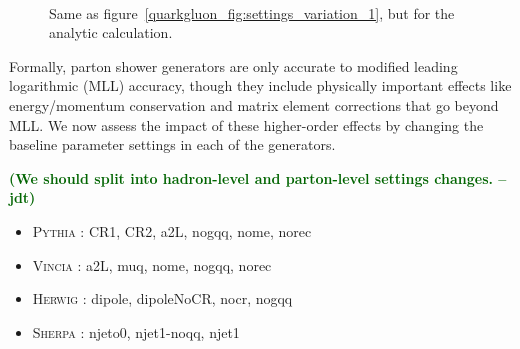 \documentclass[11pt]{cernrep}
\newcommand{\jdt}[1]{\textbf{\textcolor{darkgreen}{(#1 --jdt)}}}
\begin{document}
\begin{figure}
\centering
{}
$\quad$
\caption{Same as figure~\ref{quarkgluon_fig:settings_variation_1}, but for the analytic calculation.}
\end{figure}



Formally, parton shower generators are only accurate to modified leading logarithmic (MLL) accuracy, though they include physically important effects like energy/momentum conservation and matrix element corrections that go beyond MLL.  We now assess the impact of these higher-order effects by changing the baseline parameter settings in each of the generators.

\jdt{We should split into hadron-level and parton-level settings changes.}


\begin{itemize}
\item \textsc{Pythia} : CR1, CR2, a2L, nogqq, nome, norec
\item \textsc{Vincia} : a2L, muq, nome, nogqq, norec
\item \textsc{Herwig} : dipole, dipoleNoCR, nocr, nogqq
\item \textsc{Sherpa} : njeto0, njet1-noqq, njet1
\end{itemize}
\end{document}

